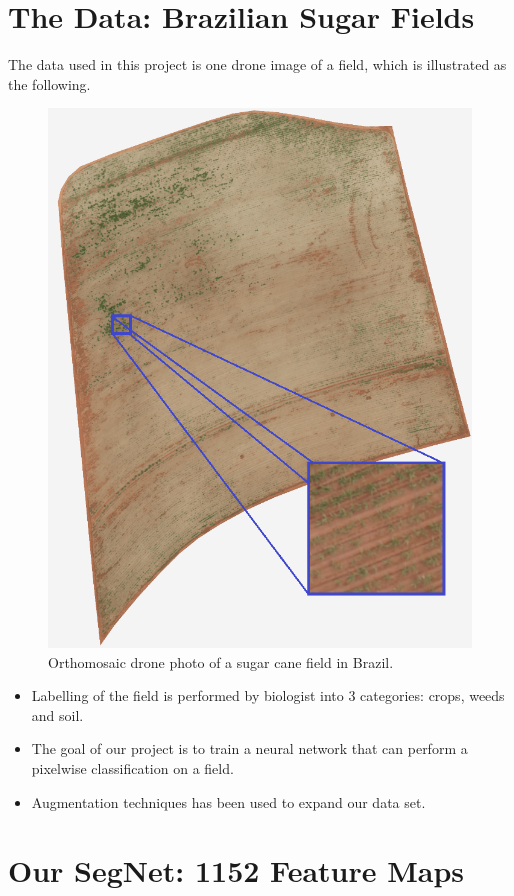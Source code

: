 \documentclass[
    ,title     = {{Image Segmentation for Smart Agriculture}}
    ,subject   = {{This is the subject of my work}}
    ,papersize = {{a1paper}}
    ,nocrop
]{dtuposter}
\begin{document}
\begin{dtupostercontent}
\section{The Data: Brazilian Sugar Fields}
The data used in this project is one drone image of a field, which is illustrated as the following.
\begin{figure}
\centering
\includegraphics[width=.7\linewidth]{raw-min3}
\caption{Orthomosaic drone photo of a sugar cane field in Brazil.}
\end{figure}
\begin{itemize}
	\item Labelling of the field is performed by biologist into 3 categories: crops, weeds and soil.
	\item The goal of our project is to train a neural network that can perform a pixelwise classification on a field.
	\item Augmentation techniques has been used to expand our data set.
\end{itemize}

\section{Our SegNet: 1152 Feature Maps}




\end{dtupostercontent}
\end{document}
